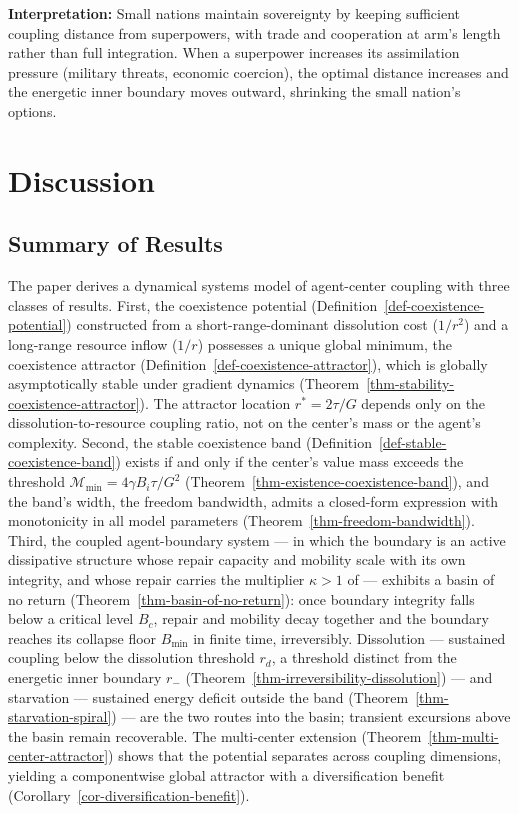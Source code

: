 \documentclass[11pt]{article}
\theoremstyle{plain}
\theoremstyle{definition}
\theoremstyle{remark}
\let\origsection\section
\renewcommand{\section}{\needspace{12\baselineskip}\origsection}
\let\origsubsection\subsection
\renewcommand{\subsection}{\needspace{7\baselineskip}\origsubsection}
\begin{document}
\textbf{Interpretation:} Small nations maintain sovereignty by keeping
sufficient coupling distance from superpowers, with trade and
cooperation at arm's length rather than full integration. When a
superpower increases its assimilation pressure (military threats,
economic coercion), the optimal distance increases and the energetic
inner boundary moves outward, shrinking the small nation's options.

\section{Discussion}\label{discussion}

\subsection{Summary of Results}\label{summary-of-results}

The paper derives a dynamical systems model of agent-center coupling
with three classes of results. First, the coexistence potential
(Definition~\ref{def-coexistence-potential}) constructed from a
short-range-dominant dissolution cost (\(1/r^2\)) and a long-range
resource inflow (\(1/r\)) possesses a unique global minimum, the
coexistence attractor (Definition~\ref{def-coexistence-attractor}),
which is globally asymptotically stable under gradient dynamics
(Theorem~\ref{thm-stability-coexistence-attractor}). The attractor
location \(r^* = 2\tau/G\) depends only on the dissolution-to-resource
coupling ratio, not on the center's mass or the agent's complexity.
Second, the stable coexistence band
(Definition~\ref{def-stable-coexistence-band}) exists if and only if the
center's value mass exceeds the threshold
\(\mathcal{M}_{\min} = 4\gamma B_i \tau / G^2\)
(Theorem~\ref{thm-existence-coexistence-band}), and the band's width,
the freedom bandwidth, admits a closed-form expression with monotonicity
in all model parameters (Theorem~\ref{thm-freedom-bandwidth}). Third,
the coupled agent-boundary system --- in which the boundary is an active
dissipative structure whose repair capacity and mobility scale with its
own integrity, and whose repair carries the multiplier \(\kappa > 1\) of
\citep{TC-IV} --- exhibits a basin of no return
(Theorem~\ref{thm-basin-of-no-return}): once boundary integrity falls
below a critical level \(B_c\), repair and mobility decay together and
the boundary reaches its collapse floor \(B_{\min}\) in finite time,
irreversibly. Dissolution --- sustained coupling below the dissolution
threshold \(r_d\), a threshold distinct from the energetic inner
boundary \(r_-\) (Theorem~\ref{thm-irreversibility-dissolution}) --- and
starvation --- sustained energy deficit outside the band
(Theorem~\ref{thm-starvation-spiral}) --- are the two routes into the
basin; transient excursions above the basin remain recoverable. The
multi-center extension (Theorem~\ref{thm-multi-center-attractor}) shows
that the potential separates across coupling dimensions, yielding a
componentwise global attractor with a diversification benefit
(Corollary~\ref{cor-diversification-benefit}).
\end{document}
